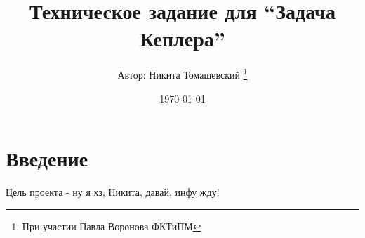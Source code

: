 

\title{Техническое задание для ``Задача Кеплера''}
\author{Автор: Никита Томашевский \thanks{При участии Павла Воронова ФКТиПМ}}
\date{\today}


 \maketitle\newpage
 \tableofcontents\newpage
 \section{Введение}
 Цель проекта - ну я хз, Никита, давай, инфу жду!

